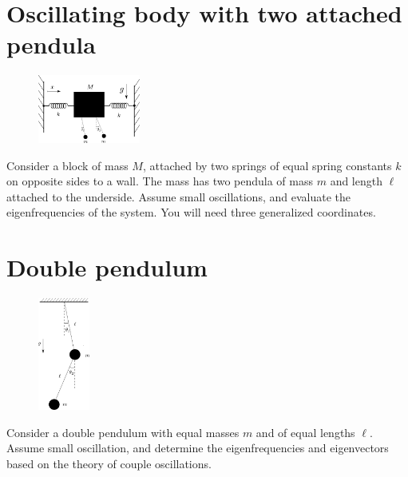 \documentclass{article}
\begin{document}
    \section{Oscillating body with two attached pendula}
    \begin{figure}
        \vspace{-0.5cm}
        \includegraphics[width=0.3\textwidth]{figures/figure_3.pdf}
        \vspace{-1.5cm}
    \end{figure}
    Consider a block of mass $M$, attached by two springs of equal spring constants $k$ on opposite sides to a wall. The mass has two pendula of mass $m$ and length $\ell$ attached to the underside. Assume small oscillations, and evaluate the eigenfrequencies of the system. You will need three generalized coordinates.

    \section{Double pendulum}
    \begin{figure}
        \vspace{-0.5cm}
        \includegraphics[width=0.15\textwidth]{figures/figure_4.pdf}
    \end{figure}
    Consider a double pendulum with equal masses $m$ and of equal lengths $\ell$. Assume small oscillation, and determine the eigenfrequencies and eigenvectors based on the theory of couple oscillations.
\end{document}
